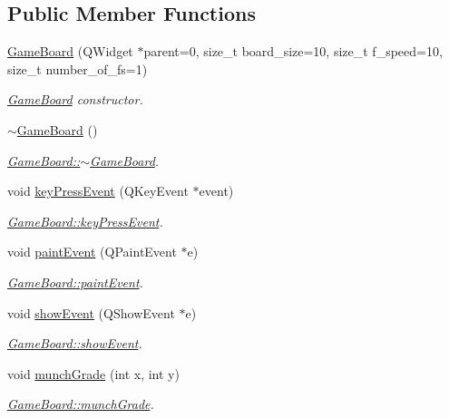 \subsection*{Public Member Functions}
\begin{DoxyCompactItemize}
\item 
\hyperlink{class_game_board_a02e83c0384303c16e8155ca759b882d0}{Game\+Board} (Q\+Widget $\ast$parent=0, size\+\_\+t board\+\_\+size=10, size\+\_\+t f\+\_\+speed=10, size\+\_\+t number\+\_\+of\+\_\+fs=1)
\begin{DoxyCompactList}\small\item\em \hyperlink{class_game_board}{Game\+Board} constructor. \end{DoxyCompactList}\item 
\hyperlink{class_game_board_a48e19b4953c87cc5eea1f9152d09499e}{$\sim$\+Game\+Board} ()
\begin{DoxyCompactList}\small\item\em \hyperlink{class_game_board_a48e19b4953c87cc5eea1f9152d09499e}{Game\+Board\+::$\sim$\+Game\+Board}. \end{DoxyCompactList}\item 
void \hyperlink{class_game_board_a3fdf1e6bfcc24a0930196be5fc3150c1}{key\+Press\+Event} (Q\+Key\+Event $\ast$event)
\begin{DoxyCompactList}\small\item\em \hyperlink{class_game_board_a3fdf1e6bfcc24a0930196be5fc3150c1}{Game\+Board\+::key\+Press\+Event}. \end{DoxyCompactList}\item 
void \hyperlink{class_game_board_a07896dc68fa3dc7ab7206e20da4c8dea}{paint\+Event} (Q\+Paint\+Event $\ast$e)
\begin{DoxyCompactList}\small\item\em \hyperlink{class_game_board_a07896dc68fa3dc7ab7206e20da4c8dea}{Game\+Board\+::paint\+Event}. \end{DoxyCompactList}\item 
void \hyperlink{class_game_board_a8cf0f1726da9d4fdfe9d044d290aca9d}{show\+Event} (Q\+Show\+Event $\ast$e)
\begin{DoxyCompactList}\small\item\em \hyperlink{class_game_board_a8cf0f1726da9d4fdfe9d044d290aca9d}{Game\+Board\+::show\+Event}. \end{DoxyCompactList}\item 
void \hyperlink{class_game_board_ad0652bc1afe57f5c90363ff23b085f1d}{munch\+Grade} (int x, int y)
\begin{DoxyCompactList}\small\item\em \hyperlink{class_game_board_ad0652bc1afe57f5c90363ff23b085f1d}{Game\+Board\+::munch\+Grade}. \end{DoxyCompactList}\item 

\end{DoxyCompactItemize}
